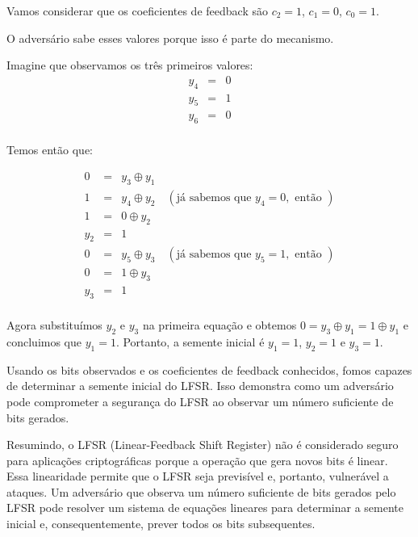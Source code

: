 \begin{example}
  Vamos considerar que os coeficientes de feedback são $c_2 = 1$, $c_1 = 0$, $c_0 = 1$.

  O adversário sabe esses valores porque isso é parte do mecanismo.

  Imagine que observamos os três primeiros valores:
  \begin{displaymath}
    \begin{array}{rcl}
      y_4 & = & 0 \\
      y_5 & = & 1 \\
      y_6 & = & 0 \\
    \end{array}
  \end{displaymath}

  Temos então que:

  \begin{displaymath}
    \begin{array}{rcl}
      0 & = & y_3 \oplus y_1 \\
      1 & = & y_4 \oplus y_2 \quad (\text{já sabemos que } y_4 = 0, \text{ então }) \\
      1 & = & 0 \oplus y_2 \\
      y_2 & = & 1 \\
      0 & = & y_5 \oplus y_3 \quad (\text{já sabemos que } y_5 = 1, \text{ então }) \\
      0 & = & 1 \oplus y_3 \\
      y_3 & = & 1 \\
    \end{array}
  \end{displaymath}

  Agora substituímos $y_2$ e $y_3$ na primeira equação e obtemos $0 = y_3 \oplus y_1 = 1 \oplus y_1$ e concluimos que $y_1 = 1$.
  Portanto, a semente inicial é $y_1 = 1$, $y_2 = 1$ e $y_3 = 1$.

  Usando os bits observados e os coeficientes de feedback conhecidos, fomos capazes de determinar a semente inicial do LFSR.
  Isso demonstra como um adversário pode comprometer a segurança do LFSR ao observar um número suficiente de bits gerados.
\end{example}

Resumindo, o LFSR (Linear-Feedback Shift Register) não é considerado seguro para aplicações criptográficas porque a operação que gera novos bits é linear.
Essa linearidade permite que o LFSR seja previsível e, portanto, vulnerável a ataques.
Um adversário que observa um número suficiente de bits gerados pelo LFSR pode resolver um sistema de equações lineares para determinar a semente inicial e, consequentemente, prever todos os bits subsequentes.

